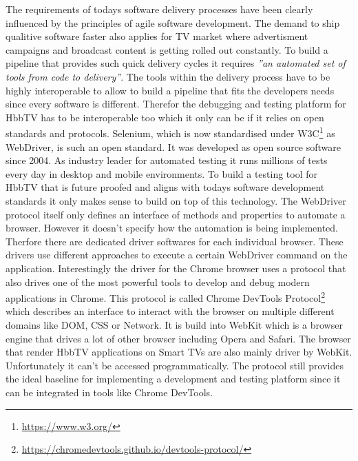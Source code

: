 The requirements of todays software delivery processes have been clearly influenced by the principles of agile software
development. The demand to ship qualitive software faster also applies for TV market where advertisment campaigns
and broadcast content is getting rolled out constantly. To build a pipeline that provides such quick delivery cycles
it requires \textit{''an automated set of tools from code to delivery''}\cite{Lehtonen2015DefiningMF}. The tools
within the delivery process have to be highly interoperable to allow to build a pipeline that fits the developers
needs since every software is different. Therefor the debugging and testing platform for HbbTV has to be interoperable
too which it only can be if it relies on open standards and protocols. Selenium, which is now standardised under
W3C\footnote{\url{https://www.w3.org/}} as WebDriver, is such an open standard. It was developed as open source
software since 2004. As industry leader for automated testing it runs millions of tests every day in desktop and mobile
environments. To build a testing tool for HbbTV that is future proofed and aligns with todays software development
standards it only makes sense to build on top of this technology. The WebDriver protocol itself only defines an
interface of methods and properties to automate a browser. However it doesn't specify how the automation is being
implemented. Therfore there are dedicated driver softwares for each individual browser. These drivers use different
approaches to execute a certain WebDriver command on the application. Interestingly the driver for the Chrome browser
uses a protocol that also drives one of the most powerful tools to develop and debug modern applications in Chrome.
This protocol is called Chrome DevTools Protocol\footnote{\url{https://chromedevtools.github.io/devtools-protocol/}}
which describes an interface to interact with the browser on multiple different domains like DOM, CSS or Network. It
is build into WebKit which is a browser engine that drives a lot of other browser including Opera and Safari. The
browser that render HbbTV applications on Smart TVs are also mainly driver by WebKit. Unfortunately it can't be accessed
programmatically. The protocol still provides the ideal baseline for implementing a development and testing platform
since it can be integrated in tools like Chrome DevTools.


